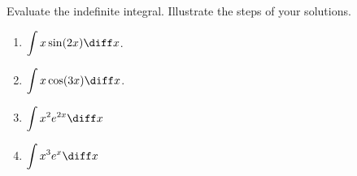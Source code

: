 Evaluate the indefinite integral. Illustrate the steps of your solutions.
\begin{multicols}{2}
\begin{enumerate}
\item $\displaystyle \int x \sin (2x)\diff x$.
\item $\displaystyle \int x \cos (3x)\diff x$.
\item $\displaystyle \int x^2 e^{2x}\diff x$
\item $\displaystyle \int x^3 e^x \diff x$
\end{enumerate}

\end{multicols}